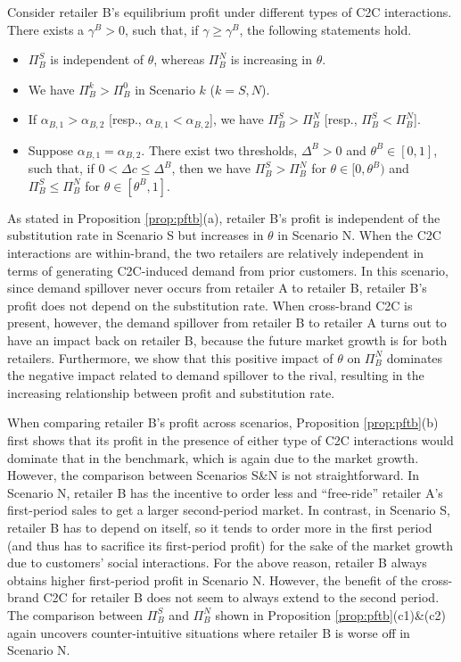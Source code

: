 \documentclass[nonblindrev,copyedit]{informs1}
\begin{document}
\begin{proposition}
\label{prop:pftb}
Consider retailer B's equilibrium profit under different types of C2C interactions. There exists a $\gamma^B>0$, such that, if $\gamma \geq \gamma^B$, the following statements hold.
\begin{itemize}
\item[(a)] $\Pi^S_B$ is independent of $\theta$, whereas $\Pi^N_B$ is increasing in $\theta$.
\item[(b)] We have $\Pi^k_{B} > \Pi^0_{B}$ in Scenario $k$ ($k = S, N$).
\item[(c1)] If $\alpha_{B,1} > \alpha_{B,2}$ [resp., $\alpha_{B,1} < \alpha_{B,2}$], we have $\Pi^S_{B} > \Pi^N_{B}$ [resp., $\Pi^S_{B} < \Pi^N_{B}$].
\item[(c2)] Suppose $\alpha_{B,1} = \alpha_{B,2}$. There exist two thresholds, $\Delta^B>0$ and $\theta^B \in [0,1]$, such that, if $0<\Delta c \leq \Delta^B$, then we have $\Pi^S_{B} > \Pi^N_{B}$ for $\theta \in [0, \theta^B)$ and $\Pi^S_{B} \leq \Pi^N_{B}$ for $\theta \in [\theta^B,1]$.
\end{itemize}
\end{proposition}

As stated in Proposition \ref{prop:pftb}(a), retailer B's profit is independent of the substitution rate in Scenario S but increases in $\theta$ in Scenario N. When the C2C interactions are within-brand, the two retailers are relatively independent in terms of generating C2C-induced demand from prior customers. In this scenario, since demand spillover never occurs from retailer A to retailer B, retailer B's profit does not depend on the substitution rate. When cross-brand C2C is present, however, the demand spillover from retailer B to retailer A turns out to have an impact back on retailer B, because the future market growth is for both retailers. Furthermore, we show that this positive impact of $\theta$ on $\Pi^N_B$ dominates the negative impact related to demand spillover to the rival, resulting in the increasing relationship between profit and substitution rate.

When comparing retailer B's profit across scenarios, Proposition \ref{prop:pftb}(b) first shows that its profit in the presence of either type of C2C interactions would dominate that in the benchmark, which is again due to the market growth. However, the comparison between Scenarios S\&N is not straightforward.
In Scenario N, retailer B has the incentive to order less and ``free-ride'' retailer A's first-period sales to get a larger second-period market. In contrast, in Scenario S, retailer B has to depend on itself, so it tends to order more in the first period (and thus has to sacrifice its first-period profit) for the sake of the market growth due to customers' social interactions. For the above reason, retailer B always obtains higher first-period profit in Scenario N. However, the benefit of the cross-brand C2C for retailer B does not seem to always extend to the second period. The comparison between $\Pi^S_B$ and $\Pi^N_B$ shown in Proposition \ref{prop:pftb}(c1)\&(c2) again uncovers counter-intuitive situations where retailer B is worse off in Scenario N.
\end{document}
